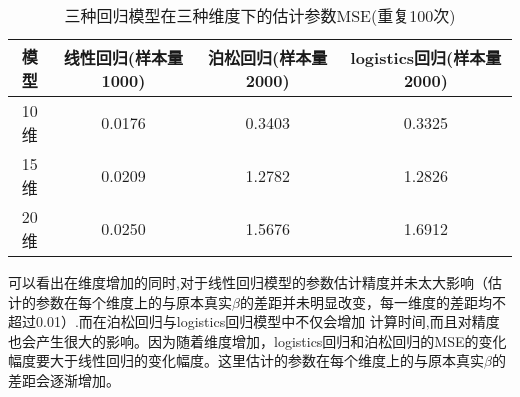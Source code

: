 \begin{table}[htbp]
    \centering
    \caption{三种回归模型在三种维度下的估计参数MSE(重复100次)}
    \label{tab:compare_mse}
    \begin{tabular}{c|c|c|c}
    \hline
    模型  & 线性回归(样本量1000) & 泊松回归(样本量2000) & logistics回归(样本量2000) \\ \hline
    10维 & 0.0176        & 0.3403        & 0.3325               \\ \hline
    15维 & 0.0209        & 1.2782        & 1.2826               \\ \hline
    20维 & 0.0250        & 1.5676        & 1.6912               \\ \hline
    \end{tabular}
    \end{table}


可以看出在维度增加的同时,对于线性回归模型的参数估计精度并未太大影响（估计的参数在每个维度上的与原本真实$\beta$的差距并未明显改变，每一维度的差距均不超过0.01）.而在泊松回归与logistics回归模型中不仅会增加
计算时间,而且对精度也会产生很大的影响。因为随着维度增加，logistics回归和泊松回归的MSE的变化幅度要大于线性回归的变化幅度。这里估计的参数在每个维度上的与原本真实$\beta$的差距会逐渐增加。